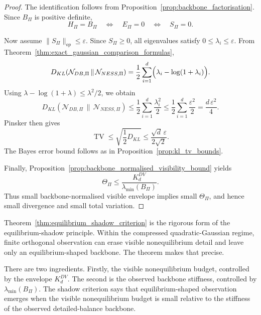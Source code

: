 \documentclass[11pt,a4paper]{article}
\numberwithin{equation}{section}
\theoremstyle{thmcompact}
\theoremstyle{remark}
\begin{document}
\begin{proof}
The identification follows from Proposition~\ref{prop:backbone_factorisation}. Since \(B_\Pi\) is positive definite,
\begin{equation}
H_\Pi=B_\Pi
\quad\Longleftrightarrow\quad
E_\Pi=0
\quad\Longleftrightarrow\quad
S_\Pi=0.
\end{equation}

Now assume \(\|S_\Pi\|_{op}\le \varepsilon\). Since \(S_\Pi\ge 0\), all eigenvalues satisfy \(0\le \lambda_i\le \varepsilon\). From Theorem~\ref{thm:exact_gaussian_comparison_formulas},
\begin{equation}
D_{KL}\!\left(\mathcal N_{DB,\Pi}\,\|\,\mathcal N_{NESS,\Pi}\right)
=
\frac12\sum_{i=1}^{d}\Bigl(\lambda_i-\log(1+\lambda_i)\Bigr).
\end{equation}
Using \(\lambda-\log(1+\lambda)\le \lambda^2/2\), we obtain
\begin{equation}
D_{KL}\!\left(\mathcal N_{DB,\Pi}\,\|\,\mathcal N_{NESS,\Pi}\right)
\le
\frac12\sum_{i=1}^{d}\frac{\lambda_i^2}{2}
\le
\frac12\sum_{i=1}^{d}\frac{\varepsilon^2}{2}
=
\frac{d\,\varepsilon^2}{4}.
\end{equation}
Pinsker then gives
\begin{equation}
\operatorname{TV}\le \sqrt{\frac12 D_{KL}}\le \frac{\sqrt d\,\varepsilon}{2\sqrt2}.
\end{equation}
The Bayes error bound follows as in Proposition~\ref{prop:kl_tv_bounds}.

Finally, Proposition~\ref{prop:backbone_normalised_visibility_bound} yields
\begin{equation}
\Theta_\Pi
\le
\frac{K_d^{DV}}{\lambda_{\min}(B_\Pi)}.
\end{equation}
Thus small backbone-normalised visible envelope implies small \(\Theta_\Pi\), and hence small divergence and small total variation.
\end{proof}

Theorem~\ref{thm:equilibrium_shadow_criterion} is the rigorous form of the equilibrium-shadow principle. Within the compressed quadratic-Gaussian regime, finite orthogonal observation can erase visible nonequilibrium detail and leave only an equilibrium-shaped backbone. The theorem makes that precise.

There are two ingredients. Firstly, the visible nonequilibrium budget, controlled by the envelope \(K_d^{DV}\). The second is the observed backbone stiffness, controlled by \(\lambda_{\min}(B_\Pi)\). The shadow criterion says that equilibrium-shaped observation emerges when the visible nonequilibrium budget is small relative to the stiffness of the observed detailed-balance backbone.
\end{document}
